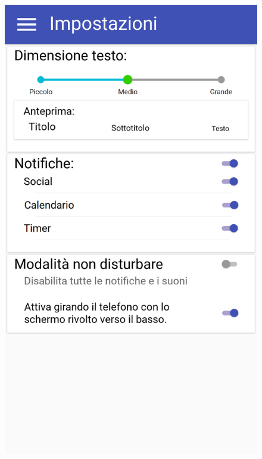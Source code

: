 \begin{figure}[H]
	\begin{minipage}{.49\textwidth}
		\includegraphics[width=\textwidth]{img/wireframe/impostazioni_non_disturbare_non_attiva.png}
	\end{minipage}
	\begin{minipage}{.49\textwidth}

\end{minipage}
\end{figure}
